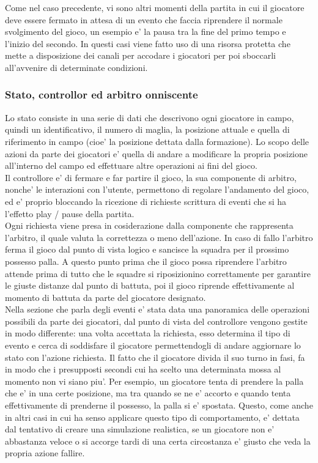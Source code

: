 Come nel caso precedente, vi sono altri momenti della partita in cui il giocatore deve essere fermato in attesa di un evento che faccia riprendere il normale svolgimento del gioco, un esempio e' la pausa tra la fine del primo tempo e l'inizio del secondo. In questi casi viene fatto uso di una risorsa protetta che mette a disposizione dei canali per accodare i giocatori per poi sboccarli all'avvenire di determinate condizioni.

\subsubsection{Stato, controllor ed arbitro onniscente}
\label{sec:analisi_concorrenza_controller_arbitro}

Lo stato consiste in una serie di dati che descrivono ogni giocatore in campo, quindi un identificativo, il numero di maglia, la posizione attuale e quella di riferimento in campo (cioe' la posizione dettata dalla formazione). Lo scopo delle azioni da parte dei giocatori e' quella di andare a modificare la propria posizione all'interno del campo ed effettuare altre operazioni ai fini del gioco.\\

Il controllore e' di fermare e far partire il gioco, la sua componente di arbitro, nonche' le interazioni con l'utente, permettono di regolare l'andamento del gioco, ed e' proprio bloccando la ricezione di richieste scrittura di eventi che si ha l'effetto play / pause della partita.\\

Ogni richiesta viene presa in cosiderazione dalla componente che rappresenta l'arbitro, il quale valuta la correttezza o meno dell'azione. In caso di fallo l'arbitro ferma il gioco dal punto di vista logico e sancisce la squadra per il prossimo possesso palla. A questo punto prima che il gioco possa riprendere l'arbitro attende prima di tutto che le squadre si riposizionino correttamente per garantire le giuste distanze dal punto di battuta, poi il gioco riprende effettivamente al momento di battuta da parte del giocatore designato.\\

Nella sezione che parla degli eventi e' stata data una panoramica delle operazioni possibili da parte dei giocatori, dal punto di vista del controllore vengono gestite in modo differente: una volta accettata la richiesta, esso determina il tipo di evento e cerca di soddisfare il giocatore permettendogli di andare aggiornare lo stato con l'azione richiesta. Il fatto che il giocatore divida il suo turno in fasi, fa in modo che i presupposti secondi cui ha scelto una determinata mossa al momento non vi siano piu'. Per esempio, un giocatore tenta di prendere la palla che e' in una certe posizione, ma tra quando se ne e' accorto e quando tenta effettivamente di prenderne il possesso, la palla si e' spostata. Questo, come anche in altri casi in cui ha senso applicare questo tipo di comportamento, e' dettata dal tentativo di creare una simulazione realistica, se un giocatore non e' abbastanza veloce o si accorge tardi di una certa circostanza e' giusto che veda la propria azione fallire.\\


